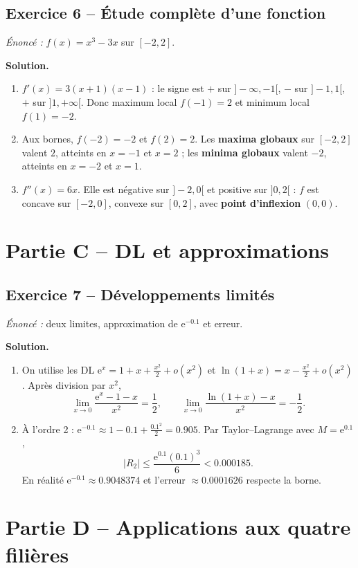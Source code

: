 \documentclass[11pt,a4paper,oneside]{article}
\newcommand{\e}{\mathrm e}
\newcommand{\solution}{\textbf{\color{Sarcelle}Solution.}\enspace}
\begin{document}
\subsection*{Exercice 6 -- Étude complète d'une fonction}
\textit{Énoncé :} $f(x)=x^3-3x$ sur $[-2,2]$.

\solution 
\begin{enumerate}[label=\alph*)]
\item $f'(x)=3(x+1)(x-1)$ : le signe est $+$ sur $]-\infty,-1[$, $-$ sur $]-1,1[$, $+$ sur $]1,+\infty[$. Donc maximum local $\boxed{f(-1)=2}$ et minimum local $\boxed{f(1)=-2}$.
\item Aux bornes, $f(-2)=-2$ et $f(2)=2$. Les \textbf{maxima globaux} sur $[-2,2]$ valent $2$, atteints en $x=-1$ et $x=2$ ; les \textbf{minima globaux} valent $-2$, atteints en $x=-2$ et $x=1$.
\item $f''(x)=6x$. Elle est négative sur $]-2,0[$ et positive sur $]0,2[$ : $f$ est concave sur $[-2,0]$, convexe sur $[0,2]$, avec \textbf{point d'inflexion} $\boxed{(0,0)}$.
\end{enumerate}

\section*{Partie C -- DL et approximations}
\subsection*{Exercice 7 -- Développements limités}
\textit{Énoncé :} deux limites, approximation de $\e^{-0.1}$ et erreur.

\solution
\begin{enumerate}[label=\alph*)]
\item On utilise les DL $\e^x=1+x+\frac{x^2}2+o(x^2)$ et $\ln(1+x)=x-\frac{x^2}2+o(x^2)$. Après division par $x^2$,
\[\boxed{\lim_{x\to0}\frac{\e^x-1-x}{x^2}=\frac12},\qquad
\boxed{\lim_{x\to0}\frac{\ln(1+x)-x}{x^2}=-\frac12}.\]
\item À l'ordre 2 : $\e^{-0.1}\approx 1-0.1+\frac{0.1^2}{2}=\boxed{0.905}$. Par Taylor--Lagrange avec $M=\e^{0.1}$,
\[\boxed{|R_2|\le\frac{\e^{0.1}(0.1)^3}{6}<0.000185}.\]
En réalité $\e^{-0.1}\approx0.9048374$ et l'erreur $\approx0.0001626$ respecte la borne.
\end{enumerate}

\section*{Partie D -- Applications aux quatre filières}
\end{document}
